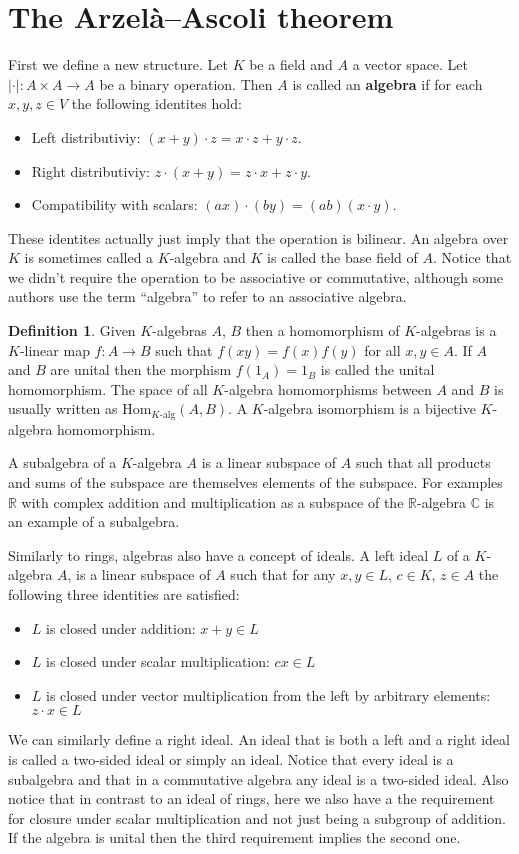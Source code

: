 \documentclass[11pt,a4paper]{article}
\theoremstyle{definition}
\newtheorem{definition}{Definition}[section]
\theoremstyle{plain}
\newcommand{\R}{\mathbb{R}}
\newcommand{\C}{\mathbb{C}}
\begin{document}
	\newpage
	
	\section{The Arzelà–Ascoli theorem}
	First we define a new structure. Let $K$ be a field and $A$ a vector 
	space. Let $|\cdot| \colon A \times A \to A$ be a binary operation.
	Then $A$ is called an \textbf{algebra} if for each $x,y,z \in V$ 
	the following identites hold:
	\begin{itemize}
		\item Left distributiviy: $(x + y) \cdot z = x \cdot z + y \cdot z$.
		\item Right distributiviy: $z \cdot (x + y) = z \cdot x + z \cdot y$.
		\item Compatibility with scalars: 
		$(ax) \cdot (by) = (ab) (x \cdot y)$.
	\end{itemize}
	These identites actually just imply that the operation is bilinear.
	An algebra over $K$ is sometimes called a $K$-algebra and $K$ is
	called the base field of $A$. Notice that we didn't require the operation
	to be associative or commutative, although some authors use the term
	``algebra'' to refer to an associative algebra.
	\begin{definition}
		Given $K$-algebras $A$, $B$ then a homomorphism of $K$-algebras
		is a $K$-linear map $f \colon A \to B$ such that $f(xy)=f(x)f(y)$
		for all $x,y \in A$. If $A$ and $B$ are unital then the morphism
		$f(1_A) = 1_B$ is called the unital homomorphism. The space
		of all $K$-algebra homomorphisms between $A$ and $B$ is usually 
		written as ${\mathrm{Hom}}_{K\text{-alg}}(A,B)$. A $K$-algebra
		isomorphism is a bijective $K$-algebra homomorphism.
	\end{definition}
	A subalgebra of a $K$-algebra $A$ is a linear subspace of $A$ such
	that all products and sums of the subspace are themselves elements
	of the subspace. For examples $\R$ with complex addition and 
	multiplication as a subspace of the $\R$-algebra $\C$ is an example
	of a subalgebra.
	
	Similarly to rings, algebras also have a concept of ideals. A left ideal
	$L$ of a $K$-algebra $A$, is a linear subspace of $A$ such that for
	any $x,y \in L$, $c \in K$, $z \in A$ the following three identities
	are satisfied:
	\begin{itemize}
		\item $L$ is closed under addition: $x + y \in L$
		\item $L$ is closed under scalar multiplication: $cx \in L$
		\item $L$ is closed under vector multiplication from the left
		by arbitrary elements: $z \cdot x \in L$
	\end{itemize}
	We can similarly define a right ideal. An ideal that is both a left and
	a right ideal is called a two-sided ideal or simply an ideal. Notice
	that every ideal is a subalgebra and that in a commutative algebra
	any ideal is a two-sided ideal. Also notice that in contrast to an
	ideal of rings, here we also have a the requirement for closure under
	scalar multiplication and not just being a subgroup of addition.
	If the algebra is unital then the third requirement implies the second
	one.
	
\end{document}
